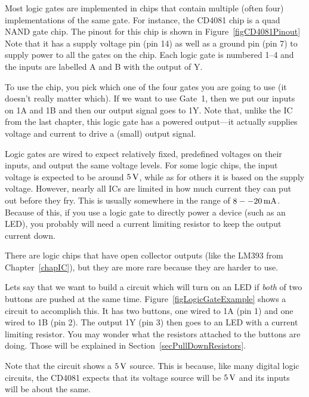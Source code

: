 
Most logic gates are implemented in chips that contain multiple (often four) implementations of the same gate.
For instance, the CD4081 chip is a quad NAND gate chip.
The pinout for this chip is shown in Figure~\ref{figCD4081Pinout}
Note that it has a supply voltage pin (pin 14) as well as a ground pin (pin 7) to supply power to all the gates on the chip.
Each logic gate is numbered 1--4 and the inputs are labelled A and B with the output of Y.

To use the chip, you pick which one of the four gates you are going to use (it doesn't really matter which).
If we want to use Gate~1, then we put our inputs on 1A and 1B and then our output signal goes to 1Y.
Note that, unlike the IC from the last chapter, this logic gate has a powered output---it actually supplies voltage and current to drive a (small) output signal.

Logic gates are wired to expect relatively fixed, predefined voltages on their inputs, and output the same voltage levels.
For some logic chips, the input voltage is expected to be around $5\,\si{\volt}$, while as for others it is based on the supply voltage.
However, nearly all ICs are limited in how much current they can put out before they fry.  
This is usually somewhere in the range of $8--20\,\si{\milli\ampere}$.
Because of this, if you use a logic gate to directly power a device (such as an LED), you probably will need a current limiting resistor to keep the output current down.

There are logic chips that have open collector outputs (like the LM393 from Chapter~\ref{chapIC}), but they are more rare because they are harder to use.


Lets say that we want to build a circuit which will turn on an LED if \emph{both} of two buttons are pushed at the same time.
Figure~\ref{figLogicGateExample} shows a circuit to accomplish this.
It has two buttons, one wired to 1A (pin 1) and one wired to 1B (pin 2).
The output 1Y (pin 3) then goes to an LED with a current limiting resistor.
You may wonder what the resistors attached to the buttons are doing.
Those will be explained in Section~\ref{secPullDownResistors}.

Note that the circuit shows a $5\,\si{\volt}$ source.
This is because, like many digital logic circuits, the CD4081 expects that its voltage source will be $5\,\si{\volt}$ and its inputs will be about the same.

